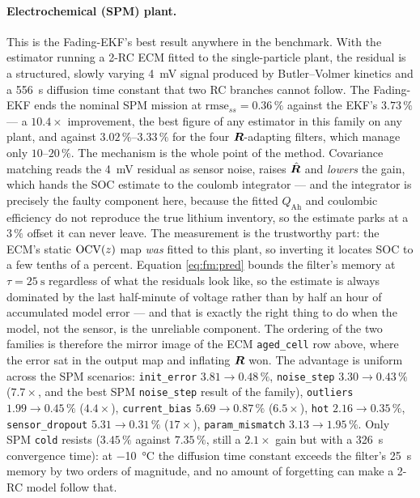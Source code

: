 \paragraph{Electrochemical (SPM) plant.}  This is the Fading-EKF's best result anywhere in the
benchmark.  With the estimator running a 2-RC ECM fitted to the single-particle plant, the residual is
a structured, slowly varying \SI{4}{\milli\volt} signal produced by Butler--Volmer kinetics and a
\SI{556}{\second} diffusion time constant that two RC branches cannot follow.  The Fading-EKF ends the
nominal SPM mission at $\mathrm{rmse}_{ss}=\mathbf{0.36\,\%}$ against the EKF's $3.73\,\%$ --- a
$\mathbf{10.4\times}$ improvement, the best figure of any estimator in this family on any plant, and
against $3.02\,\%$--$3.33\,\%$ for the four $\bm{R}$-adapting filters, which manage only $10$--$20\,\%$.
The mechanism is the whole point of the method.  Covariance matching reads the \SI{4}{\milli\volt}
residual as sensor noise, raises $\hat{\bm{R}}$ and \emph{lowers} the gain, which hands the SOC estimate
to the coulomb integrator --- and the integrator is precisely the faulty component here, because the
fitted $Q_\mathrm{Ah}$ and coulombic efficiency do not reproduce the true lithium inventory, so the
estimate parks at a $3\,\%$ offset it can never leave.  The measurement is the trustworthy part: the
ECM's static $\mathrm{OCV}(z)$ map \emph{was} fitted to this plant, so inverting it locates SOC to a few
tenths of a percent.  Equation \eqref{eq:fm:pred} bounds the filter's memory at
$\tau=\SI{25}{\second}$ regardless of what the residuals look like, so the estimate is always
dominated by the last half-minute of voltage rather than by half an hour of accumulated model error
--- and that is exactly the right thing to do when the model, not the sensor, is the unreliable
component.  The ordering of the two families is therefore the mirror image of the ECM
\texttt{aged\_cell} row above, where the error sat in the output map and inflating $\bm{R}$ won.  The
advantage is uniform across the SPM scenarios: \texttt{init\_error} $3.81\to0.48\,\%$,
\texttt{noise\_step} $3.30\to0.43\,\%$ ($7.7\times$, and the best SPM \texttt{noise\_step} result of
the family), \texttt{outliers} $1.99\to0.45\,\%$ ($4.4\times$), \texttt{current\_bias}
$5.69\to0.87\,\%$ ($6.5\times$), \texttt{hot} $2.16\to0.35\,\%$, \texttt{sensor\_dropout}
$5.31\to0.31\,\%$ ($17\times$), \texttt{param\_mismatch} $3.13\to1.95\,\%$.  Only SPM \texttt{cold}
resists ($3.45\,\%$ against $7.35\,\%$, still a $2.1\times$ gain but with a \SI{326}{\second}
convergence time): at \SI{-10}{\celsius} the diffusion time constant exceeds the filter's
\SI{25}{\second} memory by two orders of magnitude, and no amount of forgetting can make a 2-RC model
follow that.

